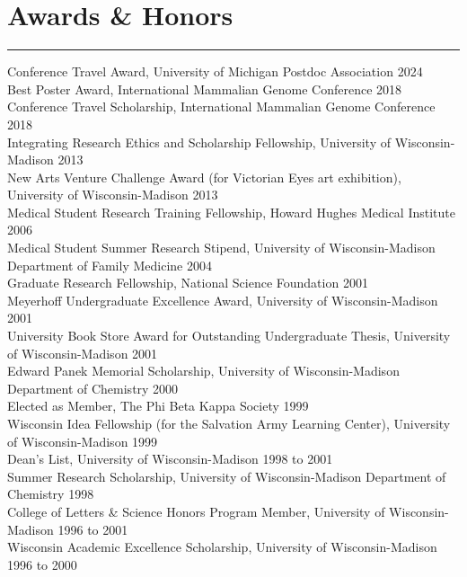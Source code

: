 \documentclass[
  10pt,
]
{article}
\begin{document}
\section{Awards \& Honors}\label{awards-honors}

\hrule

\normalsize Conference Travel Award, University of Michigan Postdoc
Association \hfill 2024\\
\normalsize Best Poster Award, International Mammalian Genome Conference
\hfill 2018\\
\normalsize Conference Travel Scholarship, International Mammalian
Genome Conference \hfill 2018\\
\normalsize Integrating Research Ethics and Scholarship Fellowship,
University of Wisconsin-Madison \hfill 2013\\
\normalsize New Arts Venture Challenge Award (for Victorian Eyes art
exhibition), University of Wisconsin-Madison \hfill 2013\\
\normalsize Medical Student Research Training Fellowship, Howard Hughes
Medical Institute \hfill 2006\\
\normalsize Medical Student Summer Research Stipend, University of
Wisconsin-Madison Department of Family Medicine \hfill 2004\\
\normalsize Graduate Research Fellowship, National Science Foundation
\hfill 2001\\
\normalsize Meyerhoff Undergraduate Excellence Award, University of
Wisconsin-Madison \hfill 2001\\
\normalsize University Book Store Award for Outstanding Undergraduate
Thesis, University of Wisconsin-Madison \hfill 2001\\
\normalsize Edward Panek Memorial Scholarship, University of
Wisconsin-Madison Department of Chemistry \hfill 2000\\
\normalsize Elected as Member, The Phi Beta Kappa Society \hfill 1999\\
\normalsize Wisconsin Idea Fellowship (for the Salvation Army Learning
Center), University of Wisconsin-Madison \hfill 1999\\
\normalsize Dean's List, University of Wisconsin-Madison \hfill 1998 to
2001\\
\normalsize Summer Research Scholarship, University of Wisconsin-Madison
Department of Chemistry \hfill 1998\\
\normalsize College of Letters \& Science Honors Program Member,
University of Wisconsin-Madison \hfill 1996 to 2001\\
\normalsize Wisconsin Academic Excellence Scholarship, University of
Wisconsin-Madison \hfill 1996 to 2000
\end{document}
